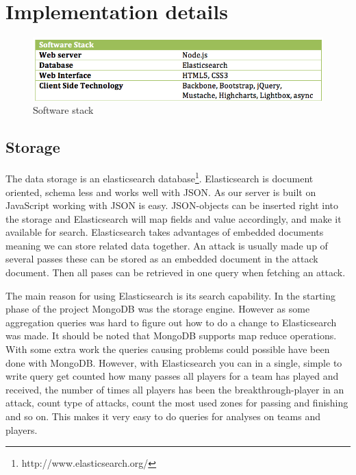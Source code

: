 \section{Implementation details}

\begin{figure}[ht!]
\centering
\includegraphics[width=1\textwidth]{images/implementation/software_stack.png}
\caption{Software stack}
\end{figure}

\subsection{Storage}

The data storage is an elasticsearch database\footnote{http://www.elasticsearch.org/}. Elasticsearch is document oriented, schema less and works well with \ac{JSON}\footnotemark. As our server is built on JavaScript working with \ac{JSON} is easy. \ac{JSON}-objects can be inserted right into the storage and Elasticsearch will map fields and value accordingly, and make it available for search.
Elasticsearch takes advantages of embedded documents meaning we can store related data together. An attack is usually made up of several passes these can be stored as an embedded document in the attack document. Then all pases can be retrieved in one query when fetching an attack.

The main reason for using Elasticsearch is its search capability. In the starting phase of the project MongoDB \footnotemark was the storage engine. However as some aggregation queries was hard to figure out how to do a change to Elasticsearch was made. It should be noted that MongoDB supports map reduce operations. With some extra work the queries causing problems could possible have been done with MongoDB. However, with Elasticsearch you can in a single, simple to write query get counted how many passes all players for a team has played and received, the number of times all players has been the breakthrough-player in an attack, count type of attacks, count the most used zones for passing and finishing and so on. This makes it very easy to do queries for analyses on teams and players.


